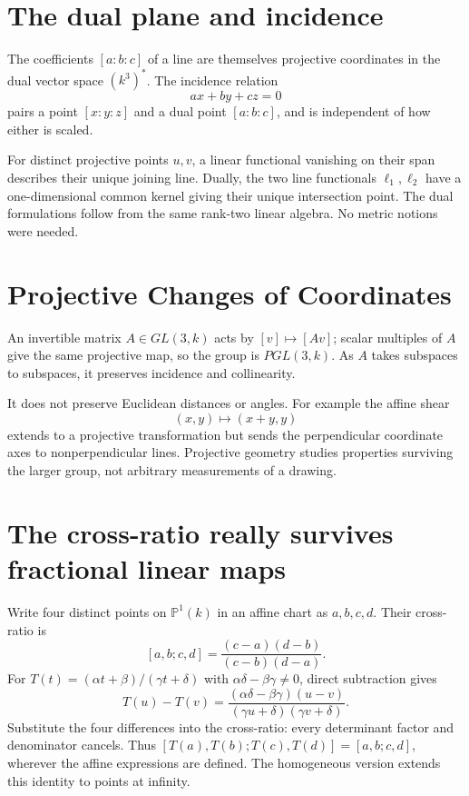 \section{The dual plane and incidence}

The coefficients \([a:b:c]\) of a line are themselves projective coordinates in the dual vector space \((k^3)^*\). The incidence relation
\[
 ax+by+cz=0
\]
pairs a point \([x:y:z]\) and a dual point \([a:b:c]\), and is independent of how either is scaled.

For distinct projective points \(u,v\), a linear functional vanishing on their span describes their unique joining line. Dually, the two line functionals \(\ell_1,\ell_2\) have a one-dimensional common kernel giving their unique intersection point. The dual formulations follow from the same rank-two linear algebra. No metric notions were needed.

\section{Projective Changes of Coordinates}

An invertible matrix \(A\in GL(3,k)\) acts by \([v]\mapsto[Av]\); scalar multiples of \(A\) give the same projective map, so the group is \(PGL(3,k)\). As \(A\) takes subspaces to subspaces, it preserves incidence and collinearity.

It does not preserve Euclidean distances or angles. For example the affine shear
\[
 (x,y)\mapsto(x+y,y)
\]
extends to a projective transformation but sends the perpendicular coordinate axes to nonperpendicular lines. Projective geometry studies properties surviving the larger group, not arbitrary measurements of a drawing.

\section{The cross-ratio really survives fractional linear maps}

Write four distinct points on \(\mathbb P^1(k)\) in an affine chart as \(a,b,c,d\). Their cross-ratio is
\[
 [a,b;c,d]=\frac{(c-a)(d-b)}{(c-b)(d-a)}.
\]
For \(T(t)=(\alpha t+\beta)/(\gamma t+\delta)\) with \(\alpha\delta-\beta\gamma\ne0\), direct subtraction gives
\[
 T(u)-T(v)=
 \frac{(\alpha\delta-\beta\gamma)(u-v)}
 {(\gamma u+\delta)(\gamma v+\delta)}.
\]
Substitute the four differences into the cross-ratio: every determinant factor and denominator cancels. Thus \([T(a),T(b);T(c),T(d)]=[a,b;c,d]\), wherever the affine expressions are defined. The homogeneous version extends this identity to points at infinity.

